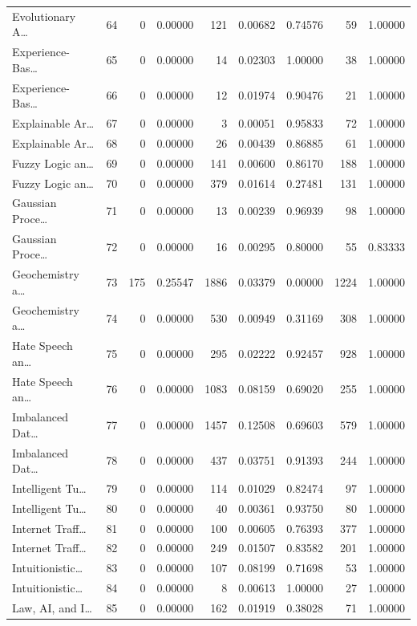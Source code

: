 \begin{table}
\begin{tabular}{lrrrrrrrr}
Evolutionary A… & 64 & 0 & 0.00000 & 121 & 0.00682 & 0.74576 & 59 & 1.00000 \\
Experience-Bas… & 65 & 0 & 0.00000 & 14 & 0.02303 & 1.00000 & 38 & 1.00000 \\
Experience-Bas… & 66 & 0 & 0.00000 & 12 & 0.01974 & 0.90476 & 21 & 1.00000 \\
Explainable Ar… & 67 & 0 & 0.00000 & 3 & 0.00051 & 0.95833 & 72 & 1.00000 \\
Explainable Ar… & 68 & 0 & 0.00000 & 26 & 0.00439 & 0.86885 & 61 & 1.00000 \\
Fuzzy Logic an… & 69 & 0 & 0.00000 & 141 & 0.00600 & 0.86170 & 188 & 1.00000 \\
Fuzzy Logic an… & 70 & 0 & 0.00000 & 379 & 0.01614 & 0.27481 & 131 & 1.00000 \\
Gaussian Proce… & 71 & 0 & 0.00000 & 13 & 0.00239 & 0.96939 & 98 & 1.00000 \\
Gaussian Proce… & 72 & 0 & 0.00000 & 16 & 0.00295 & 0.80000 & 55 & 0.83333 \\
Geochemistry a… & 73 & 175 & 0.25547 & 1886 & 0.03379 & 0.00000 & 1224 & 1.00000 \\
Geochemistry a… & 74 & 0 & 0.00000 & 530 & 0.00949 & 0.31169 & 308 & 1.00000 \\
Hate Speech an… & 75 & 0 & 0.00000 & 295 & 0.02222 & 0.92457 & 928 & 1.00000 \\
Hate Speech an… & 76 & 0 & 0.00000 & 1083 & 0.08159 & 0.69020 & 255 & 1.00000 \\
Imbalanced Dat… & 77 & 0 & 0.00000 & 1457 & 0.12508 & 0.69603 & 579 & 1.00000 \\
Imbalanced Dat… & 78 & 0 & 0.00000 & 437 & 0.03751 & 0.91393 & 244 & 1.00000 \\
Intelligent Tu… & 79 & 0 & 0.00000 & 114 & 0.01029 & 0.82474 & 97 & 1.00000 \\
Intelligent Tu… & 80 & 0 & 0.00000 & 40 & 0.00361 & 0.93750 & 80 & 1.00000 \\
Internet Traff… & 81 & 0 & 0.00000 & 100 & 0.00605 & 0.76393 & 377 & 1.00000 \\
Internet Traff… & 82 & 0 & 0.00000 & 249 & 0.01507 & 0.83582 & 201 & 1.00000 \\
Intuitionistic… & 83 & 0 & 0.00000 & 107 & 0.08199 & 0.71698 & 53 & 1.00000 \\
Intuitionistic… & 84 & 0 & 0.00000 & 8 & 0.00613 & 1.00000 & 27 & 1.00000 \\
Law, AI, and I… & 85 & 0 & 0.00000 & 162 & 0.01919 & 0.38028 & 71 & 1.00000 \\

\end{tabular}
\end{table}
